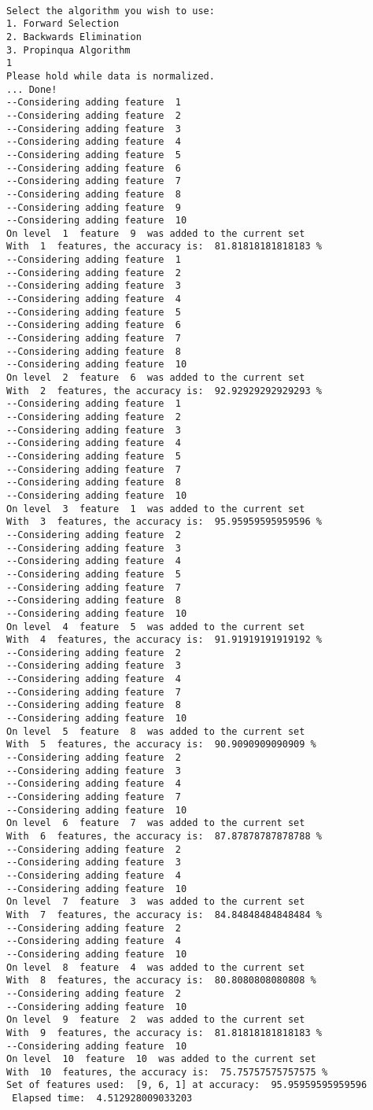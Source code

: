 \documentclass{article}
\begin{document}
\begin{lstlisting}[captionpos=b, caption=Traceback, label=listing:sparql_getallindividuals,
   basicstyle=\ttfamily]

Select the algorithm you wish to use: 
1. Forward Selection
2. Backwards Elimination
3. Propinqua Algorithm
1
Please hold while data is normalized.
... Done!
--Considering adding feature  1
--Considering adding feature  2
--Considering adding feature  3
--Considering adding feature  4
--Considering adding feature  5
--Considering adding feature  6
--Considering adding feature  7
--Considering adding feature  8
--Considering adding feature  9
--Considering adding feature  10
On level  1  feature  9  was added to the current set
With  1  features, the accuracy is:  81.81818181818183 %
--Considering adding feature  1
--Considering adding feature  2
--Considering adding feature  3
--Considering adding feature  4
--Considering adding feature  5
--Considering adding feature  6
--Considering adding feature  7
--Considering adding feature  8
--Considering adding feature  10
On level  2  feature  6  was added to the current set
With  2  features, the accuracy is:  92.92929292929293 %
--Considering adding feature  1
--Considering adding feature  2
--Considering adding feature  3
--Considering adding feature  4
--Considering adding feature  5
--Considering adding feature  7
--Considering adding feature  8
--Considering adding feature  10
On level  3  feature  1  was added to the current set
With  3  features, the accuracy is:  95.95959595959596 %
--Considering adding feature  2
--Considering adding feature  3
--Considering adding feature  4
--Considering adding feature  5
--Considering adding feature  7
--Considering adding feature  8
--Considering adding feature  10
On level  4  feature  5  was added to the current set
With  4  features, the accuracy is:  91.91919191919192 %
--Considering adding feature  2
--Considering adding feature  3
--Considering adding feature  4
--Considering adding feature  7
--Considering adding feature  8
--Considering adding feature  10
On level  5  feature  8  was added to the current set
With  5  features, the accuracy is:  90.9090909090909 %
--Considering adding feature  2
--Considering adding feature  3
--Considering adding feature  4
--Considering adding feature  7
--Considering adding feature  10
On level  6  feature  7  was added to the current set
With  6  features, the accuracy is:  87.87878787878788 %
--Considering adding feature  2
--Considering adding feature  3
--Considering adding feature  4
--Considering adding feature  10
On level  7  feature  3  was added to the current set
With  7  features, the accuracy is:  84.84848484848484 %
--Considering adding feature  2
--Considering adding feature  4
--Considering adding feature  10
On level  8  feature  4  was added to the current set
With  8  features, the accuracy is:  80.8080808080808 %
--Considering adding feature  2
--Considering adding feature  10
On level  9  feature  2  was added to the current set
With  9  features, the accuracy is:  81.81818181818183 %
--Considering adding feature  10
On level  10  feature  10  was added to the current set
With  10  features, the accuracy is:  75.75757575757575 %
Set of features used:  [9, 6, 1] at accuracy:  95.95959595959596 
 Elapsed time:  4.512928009033203
  

\end{lstlisting}
\end{document}

